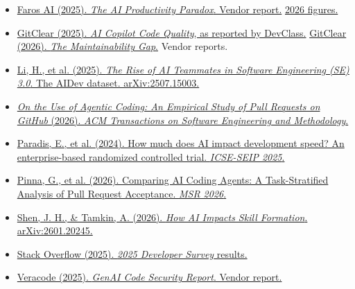 \documentclass[11pt]{article}
\begin{document}
\begin{itemize}[leftmargin=*]
  \item \href{https://243608892.fs1.hubspotusercontent-na2.net/hubfs/243608892/AI_Engineering_Impact_Report_July_2025_Faros_AI.pdf}{Faros AI (2025). \emph{The AI Productivity Paradox}. Vendor report.} \href{https://www.faros.ai/blog/key-takeaways-from-the-dora-report-2025}{2026 figures.}
  \item \href{https://www.devclass.com/ai-ml/2025/02/20/ai-is-eroding-code-quality-states-new-in-depth-report/1626250}{GitClear (2025). \emph{AI Copilot Code Quality}, as reported by DevClass.} \href{https://www.gitclear.com/recent_ai_developer_productivity_code_quality_research}{GitClear (2026). \emph{The Maintainability Gap}.} Vendor reports.
  \item \href{https://arxiv.org/pdf/2507.15003}{Li, H., et al. (2025). \emph{The Rise of AI Teammates in Software Engineering (SE) 3.0}. The AIDev dataset. arXiv:2507.15003.}
  \item \href{https://dl.acm.org/doi/10.1145/3798166}{\emph{On the Use of Agentic Coding: An Empirical Study of Pull Requests on GitHub} (2026). \emph{ACM Transactions on Software Engineering and Methodology}.}
  \item \href{https://arxiv.org/pdf/2410.12944}{Paradis, E., et al. (2024). How much does AI impact development speed? An enterprise-based randomized controlled trial. \emph{ICSE-SEIP 2025}.}
  \item \href{https://arxiv.org/abs/2602.08915}{Pinna, G., et al. (2026). Comparing AI Coding Agents: A Task-Stratified Analysis of Pull Request Acceptance. \emph{MSR 2026}.}
  \item \href{https://www.anthropic.com/research/AI-assistance-coding-skills}{Shen, J. H., \& Tamkin, A. (2026). \emph{How AI Impacts Skill Formation}. arXiv:2601.20245.}
  \item \href{https://stackoverflow.blog/2025/12/29/developers-remain-willing-but-reluctant-to-use-ai-the-2025-developer-survey-results-are-here/}{Stack Overflow (2025). \emph{2025 Developer Survey} results.}
  \item \href{https://www.businesswire.com/news/home/20250730694951/en/AI-Generated-Code-Poses-Major-Security-Risks-in-Nearly-Half-of-All-Development-Tasks-Veracode-Research-Reveals}{Veracode (2025). \emph{GenAI Code Security Report}. Vendor report.}
\end{itemize}
\end{document}
